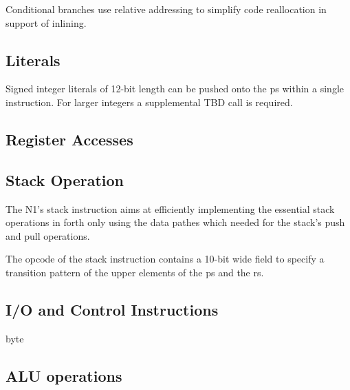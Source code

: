 Conditional branches use relative addressing to simplify code reallocation in support
of inlining.

\subsection{Literals}
\label{opcodes:literal}

Signed integer \glspl{literal} of 12-bit length can be pushed onto the \gls{ps} within
a single instruction. For larger integers a supplemental TBD \gls{call} is required.

\subsection{Register Accesses}
\label{opcodes:regacc}


\subsection{Stack Operation}
\label{opcodes:stack}

The N1's stack instruction aims at efficiently implementing the essential stack operations
in \Gls{forth} only using the data pathes which needed for the stack's push and pull
operations.

The opcode of the stack instruction contains a 10-bit wide field to specify a transition pattern of the upper elements of the \gls{ps} and the \gls{rs}.




\subsection{I/O and Control Instructions}
\label{opcodes:ioctrl}
\Gls{byte}

\subsection{ALU operations}
\label{opcodes:ioctrl}

